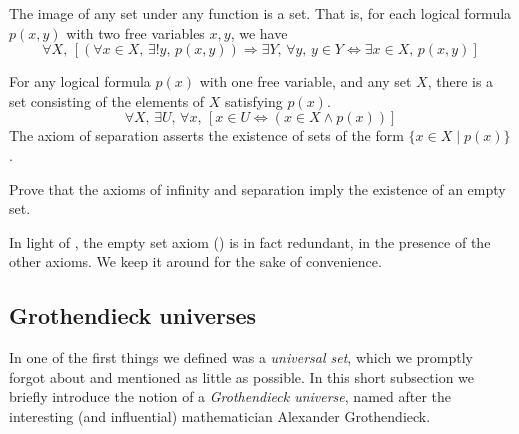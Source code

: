 \begin{axiom}
\label{axZFCReplacement}
The image of any set under any function is a set. That is, for each logical formula $p(x,y)$ with two free variables $x,y$, we have
\[ \forall X,\, [(\forall x \in X,\, \exists ! y,\, p(x,y)) \Rightarrow \exists Y,\, \forall y,\, y \in Y \Leftrightarrow \exists x \in X,\, p(x,y)] \]
\end{axiom}

\begin{axiom}
\label{axZFCSeparation}
For any logical formula $p(x)$ with one free variable, and any set $X$, there is a set consisting of the elements of $X$ satisfying $p(x)$.
\[ \forall X,\, \exists U,\, \forall x,\, [x \in U \Leftrightarrow (x \in X \wedge p(x))] \]
The axiom of separation asserts the existence of sets of the form $\{ x \in X \mid p(x) \}$.
\end{axiom}

\begin{exercise}
\label{exEmptySetFromInfinityAndSeparation}
Prove that the axioms of infinity and separation imply the existence of an empty set.

\end{exercise}

In light of , the empty set axiom () is in fact redundant, in the presence of the other axioms. We keep it around for the sake of convenience.



\subsection*{Grothendieck universes}
\label{subsecGrothendieckUniverses}

In  one of the first things we defined was a \textit{universal set}, which we promptly forgot about and mentioned as little as possible. In this short subsection we briefly introduce the notion of a \textit{Grothendieck universe}, named after the interesting (and influential) mathematician Alexander Grothendieck.

